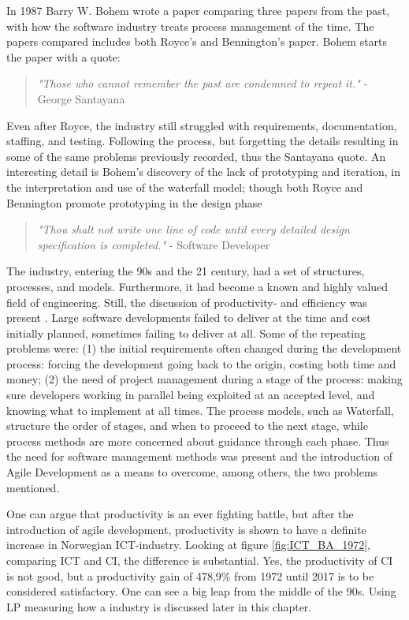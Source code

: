 In 1987 Barry W. Bohem wrote a paper comparing three papers from the past, with how the software industry treats process management of the time. The papers compared includes both Royce's and Bennington's paper. Bohem starts the paper with a quote: 
\begin{quote}
    \textit{"Those who cannot remember the past are condemned to repeat it."} - George Santayana
\end{quote}
Even after Royce, the industry still struggled with requirements, documentation, staffing, and testing. Following the process, but forgetting the details resulting in some of the same problems previously recorded, thus the Santayana quote. An interesting detail is Bohem's discovery of the lack of prototyping and iteration, in the interpretation and use of the waterfall model; though both Royce and Bennington promote prototyping in the design phase 
\begin{quote}
    \textit{"Thou shalt not write one line of code until every detailed design specification is completed."} - Software Developer 
\end{quote}
The industry, entering the 90s and the 21 century, had a set of structures, processes, and models. Furthermore, it had become a known and highly valued field of engineering. Still, the discussion of productivity- and efficiency was present \cite{boehm1987improving}. Large software developments failed to deliver at the time and cost initially planned, sometimes failing to deliver at all.  Some of the repeating problems were: (1) the initial requirements often changed during the development process: forcing the development going back to the origin, costing both time and money; (2) the need of project management during a stage of the process: making sure developers working in parallel being exploited at an accepted level, and knowing what to implement at all times. The process models, such as Waterfall, structure the order of stages, and when to proceed to the next stage, while process methods are more concerned about guidance through each phase. Thus the need for software management methods was present and the introduction of Agile Development as a means to overcome, among others, the two problems mentioned. 

One can argue that productivity is an ever fighting battle, but after the introduction of agile development, productivity is shown to have a definite increase in Norwegian ICT-industry. Looking at figure \ref{fig:ICT_BA_1972}, comparing ICT and CI, the difference is substantial. Yes, the productivity of CI is not good, but a productivity gain of 478,9\% from 1972 until 2017 is to be considered satisfactory. One can see a big leap from the middle of the 90s. Using LP measuring how a industry is discussed later in this chapter.

